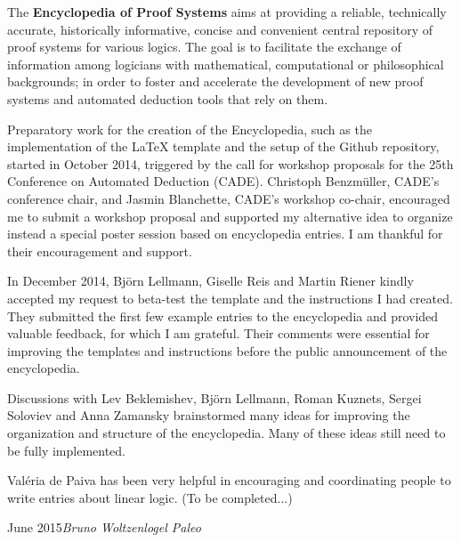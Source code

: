 
\preface

The \textbf{Encyclopedia of Proof Systems} aims at providing a reliable, technically accurate, historically informative, concise and convenient central repository of proof systems for various logics. The goal is to facilitate the exchange of information among logicians with mathematical, computational or philosophical backgrounds; in order to foster and accelerate the development of new proof systems and automated deduction tools that rely on them.

Preparatory work for the creation of the Encyclopedia, such as the implementation of the LaTeX template and the setup of the Github repository, started in October 2014, triggered by the call for workshop proposals for the 25th Conference on Automated Deduction (CADE). Christoph Benzm\"uller, CADE's conference chair, and Jasmin Blanchette, CADE's workshop co-chair, encouraged me to submit a workshop proposal and supported my alternative idea to organize instead a special poster session based on encyclopedia entries. I am thankful for their encouragement and support.

In December 2014, Bj\"orn Lellmann, Giselle Reis and Martin Riener kindly accepted my request to beta-test the template and the instructions I had created. They submitted the first few example entries to the encyclopedia and provided valuable feedback, for which I am grateful. Their comments were essential for improving the templates and instructions before the public announcement of the encyclopedia.

Discussions with Lev Beklemishev, Bj\"orn Lellmann, Roman Kuznets, Sergei Soloviev and Anna Zamansky brainstormed many ideas for improving the organization and structure of the encyclopedia. Many of these ideas still need to be fully implemented.

Val\'{e}ria de Paiva has been very helpful in encouraging and coordinating people to write entries about linear logic. (To be completed...)


\vspace{\baselineskip}
\begin{flushright}\noindent
June 2015\hfill {\it Bruno Woltzenlogel Paleo}
\end{flushright}


